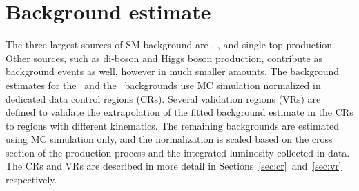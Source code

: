 \begin{table}[ht]
  \caption{The number of expected signal events pasing each of the signal
    region cuts.
    This is shown for stop masses of 500~\GeV, 800~\GeV, and 1000~\GeV.
    The estimated yields are taken from MC simulation, and are normalized
    to 20.3~\ifb, and the uncertainty given is the MC statistical uncertainty.
    The signal models have an assumed branching fraction of
    $Br(\tilde{t}\rightarrow be) = Br(\tilde{t}\rightarrow b\mu) = 0.5$.
  }
  \label{tab:sr_cutflow}
\end{table}

\section{Background estimate}
\label{sec:bkg}

The three largest sources of SM background are \TTBAR, \ZGAMMAJETS, and single
top production.
Other sources, such as di-boson and Higgs boson production, contribute as
background events as well, however in much smaller amounts.
The background estimates for the \TTBAR\ and the \ZGAMMAJETS\ backgrounds use
MC simulation normalized in dedicated data control regions (CRs).
Several validation regions (VRs) are defined to validate the extrapolation of
the fitted background estimate in the CRs to regions with different kinematics.
The remaining backgrounds are estimated using MC simulation only, and the
normalization is scaled based on the cross section of the production process and
the integrated luminosity collected in data.
The CRs and VRs are described in more detail in
Sections~\ref{sec:cr}~and~\ref{sec:vr} respectively.

